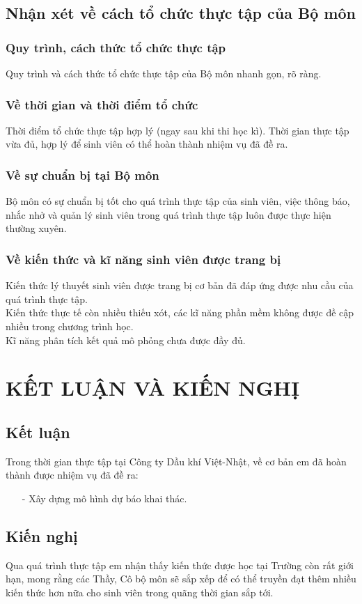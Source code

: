 \documentclass[12pt,a4paper]{report}
\begin{document}
\section{Nhận xét về cách tổ chức thực tập của Bộ môn}
\subsection{Quy trình, cách thức tổ chức thực tập}
Quy trình và cách thức tổ chức thực tập của Bộ môn nhanh gọn, rõ ràng.
\subsection{Về thời gian và thời điểm tổ chức}
Thời điểm tổ chức thực tập hợp lý (ngay sau khi thi học kì). Thời gian thực tập vừa đủ, hợp lý để sinh viên có thể hoàn thành nhiệm vụ đã đề ra.
\subsection{Về sự chuẩn bị tại Bộ môn}
Bộ môn có sự chuẩn bị tốt cho quá trình thực tập của sinh viên, việc thông báo, nhắc nhở và quản lý sinh viên trong quá trình thực tập luôn được thực hiện thường xuyên.
\newpage
\subsection{Về kiến thức và kĩ năng sinh viên được trang bị}
Kiến thức lý thuyết sinh viên được trang bị cơ bản đã đáp ứng được nhu cầu của quá trình thực tập.\\
Kiến thức thực tế còn nhiều thiếu xót, các kĩ năng phần mềm không được đề cập nhiều trong chương trình học.\\
Kĩ năng phân tích kết quả mô phỏng chưa được đầy đủ.

\chapter{KẾT LUẬN VÀ KIẾN NGHỊ}
\section{Kết luận}
Trong thời gian thực tập tại Công ty Dầu khí Việt-Nhật, về cơ bản em đã hoàn thành được nhiệm vụ đã đề ra:
	\begin{itemize}
    	\item[-] Xây dựng mô hình dự báo khai thác.
    \end{itemize}
\section{Kiến nghị}
Qua quá trình thực tập em nhận thấy kiến thức được học tại Trường còn rất giới hạn, mong rằng các Thầy, Cô bộ môn sẽ sắp xếp để có thể truyền đạt thêm nhiều kiến thức hơn nữa cho sinh viên trong quãng thời gian sắp tới.
\end{document}
